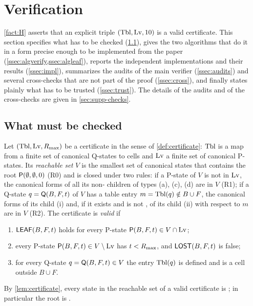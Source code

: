\section{Verification}\label{sec:verification}


\cref{fact:H} asserts that an explicit triple $(\mathrm{Tbl},\mathrm{Lv},10)$ is a valid certificate. This
section specifies what has to be checked (\cref{ssec:what}), gives the two algorithms that do it in a form
precise enough to be implemented from the paper (\cref{ssec:algverify,ssec:algleaf}), reports the independent
implementations and their results (\cref{ssec:impl}), summarizes the audits of the main verifier
(\cref{ssec:audits}) and several cross-checks that are not part of the proof (\cref{ssec:cross}), and
finally states plainly what has to be trusted (\cref{ssec:trust}). The details of the audits and of the
cross-checks are given in \cref{sec:supp-checks}.

\subsection{What must be checked}\label{ssec:what}

Let $(\mathrm{Tbl},\mathrm{Lv},R_{\max})$ be a certificate in the sense of \cref{def:certificate}: $\mathrm{Tbl}$ is a map from a
finite set of canonical Q-states to cells and $\mathrm{Lv}$ a finite set of canonical P-states. Its \emph{reachable
set} $V$ is the smallest set of canonical states that contains the root $\mathsf{P}(\emptyset,\emptyset,0)$ (R0)
and is closed under two rules: if a P-state of $V$ is not in $\mathrm{Lv}$, the canonical forms of all its
non-\VOID{} children of types (a), (c), (d) are in $V$ (R1); if a Q-state $q=\mathsf{Q}(B,F,t)$ of $V$ has a table
entry $m=\mathrm{Tbl}(q)\notin B\cup F$, the canonical forms of its child (i) and, if it exists and is not \VOID, of
its child (ii) with respect to $m$ are in $V$ (R2). The certificate is \emph{valid} if
\begin{enumerate}[label=(V\arabic*),leftmargin=3em]
\item $\mathsf{LEAF}(B,F,t)$ holds for every P-state $\mathsf{P}(B,F,t)\in V\cap\mathrm{Lv}$;
\item every P-state $\mathsf{P}(B,F,t)\in V\setminus\mathrm{Lv}$ has $t<R_{\max}$, and $\mathsf{LOST}(B,F,t)$ is false;
\item for every Q-state $q=\mathsf{Q}(B,F,t)\in V$ the entry $\mathrm{Tbl}(q)$ is defined and is a cell outside $B\cup F$.
\end{enumerate}
By \cref{lem:certificate}, every state in the reachable set of a valid certificate is \WON; in particular
the root is \WON.

